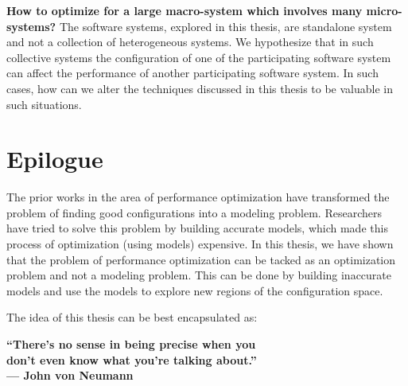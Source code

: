 \noindent\textbf{How to optimize for a large macro-system which involves many micro-systems?}
The software systems, explored in this thesis, are standalone system and not a collection of heterogeneous systems. We hypothesize that in such collective systems the configuration of one of the participating software system can affect the performance of another participating software system. In such cases, how can we alter the techniques discussed in this thesis to be valuable in such situations. 

\section{Epilogue}
The prior works in the area of performance optimization have transformed the problem of finding good configurations into a modeling problem. Researchers have tried to solve this problem by building accurate models, which made this process of optimization (using models) expensive. In this thesis, we have shown that the problem of performance optimization can be tacked as an optimization problem and not a modeling problem. This can be done by building inaccurate models and use the models to explore new regions of the configuration space. 

The idea of this thesis can be best encapsulated as: 
\begin{center}
\begin{flushleft}
    \hspace{1.5cm}\textbf{``There's no sense in being precise when you }\\
    \hspace{1.5cm}\textbf{don't even know what you're talking about.''}\\
    \hspace{1.5cm}\hfill\textbf{--- John von Neumann}\\
\end{flushleft}
\end{center}

